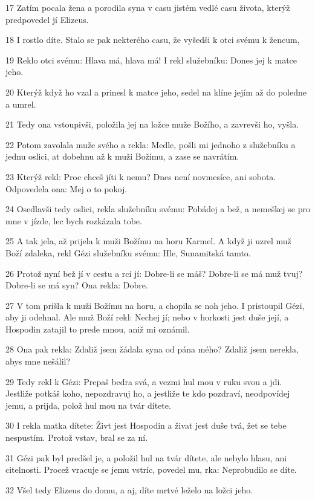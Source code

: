 \par 17 Zatím pocala žena a porodila syna v casu jistém vedlé casu života, kterýž predpovedel jí Elizeus.
\par 18 I rostlo díte. Stalo se pak nekterého casu, že vyšedši k otci svému k žencum,
\par 19 Reklo otci svému: Hlava má, hlava má! I rekl služebníku: Dones jej k matce jeho.
\par 20 Kterýž když ho vzal a prinesl k matce jeho, sedel na klíne jejím až do poledne a umrel.
\par 21 Tedy ona vstoupivši, položila jej na ložce muže Božího, a zavrevši ho, vyšla.
\par 22 Potom zavolala muže svého a rekla: Medle, pošli mi jednoho z služebníku a jednu oslici, at dobehnu až k muži Božímu, a zase se navrátím.
\par 23 Kterýž rekl: Proc chceš jíti k nemu? Dnes není novmesíce, ani sobota. Odpovedela ona: Mej o to pokoj.
\par 24 Osedlavši tedy oslici, rekla služebníku svému: Pobádej a bež, a nemeškej se pro mne v jízde, lec bych rozkázala tobe.
\par 25 A tak jela, až prijela k muži Božímu na horu Karmel. A když ji uzrel muž Boží zdaleka, rekl Gézi služebníku svému: Hle, Sunamitská tamto.
\par 26 Protož nyní bež jí v cestu a rci jí: Dobre-li se máš? Dobre-li se má muž tvuj? Dobre-li se má syn? Ona rekla: Dobre.
\par 27 V tom prišla k muži Božímu na horu, a chopila se noh jeho. I pristoupil Gézi, aby ji odehnal. Ale muž Boží rekl: Nechej jí; nebo v horkosti jest duše její, a Hospodin zatajil to prede mnou, aniž mi oznámil.
\par 28 Ona pak rekla: Zdaliž jsem žádala syna od pána mého? Zdaliž jsem nerekla, abys mne nešálil?
\par 29 Tedy rekl k Gézi: Prepaš bedra svá, a vezmi hul mou v ruku svou a jdi. Jestliže potkáš koho, nepozdravuj ho, a jestliže te kdo pozdraví, neodpovídej jemu, a prijda, polož hul mou na tvár dítete.
\par 30 I rekla matka dítete: Živt jest Hospodin a živat jest duše tvá, žet se tebe nespustím. Protož vstav, bral se za ní.
\par 31 Gézi pak byl predšel je, a položil hul na tvár dítete, ale nebylo hlasu, ani citelnosti. Procež vracuje se jemu vstríc, povedel mu, rka: Neprobudilo se díte.
\par 32 Všel tedy Elizeus do domu, a aj, díte mrtvé leželo na ložci jeho.
